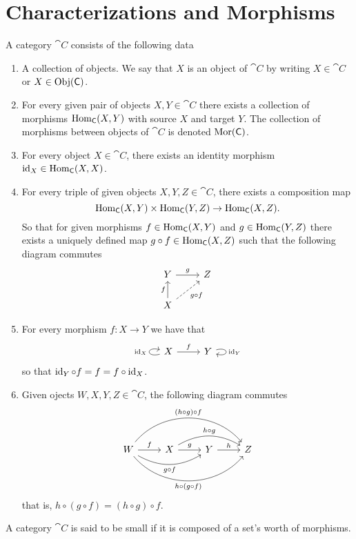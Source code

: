 \section{Characterizations and Morphisms}

\begin{definition}[Category]\label{def: category}
  A category \(\cat C\) consists of the following data
  \begin{enumerate}[(C1)]
    \item A collection of objects. We say that \(X\) is an object of \(\cat C\)
      by writing \(X \in \cat C\) or \(X \in \operatorname{Obj}(\mathsf C)\).
    \item For every given pair of objects \(X, Y \in \cat C\) there exists a
      collection of morphisms \(\operatorname{Hom}_{\mathsf C}(X, Y)\) with source \(X\) and
      target \(Y\). The collection of morphisms between objects of \(\cat C\) is
      denoted \(\operatorname{Mor}(\mathsf C)\).
    \item For every object \(X \in \cat C\), there exists an identity morphism
      \(\operatorname{id}_X \in \operatorname{Hom}_{\mathsf C}(X, X)\).
    \item For every triple of given objects \(X, Y, Z \in \cat C\), there exists
      a composition map
      \[
        \operatorname{Hom}_{\mathsf C}(X, Y) \times \operatorname{Hom}_{\mathsf C}(Y, Z) \to \operatorname{Hom}_{\mathsf C}(X, Z).
      \] 
      So that for given morphisms \(f \in \operatorname{Hom}_{\mathsf C}(X, Y)\) and \(g \in
      \operatorname{Hom}_{\mathsf C}(Y, Z)\) there exists a uniquely defined map \(g \circ f \in
      \operatorname{Hom}_{\mathsf C}(X, Z)\) such that the following diagram commutes
      \[
        \begin{tikzcd}
          Y \ar[r, "g"]
            &Z \\
          X \ar[u, "f"] \ar[ru, dashed, swap, "g \circ f"]
        \end{tikzcd}
      \]
    \item For every morphism \(f: X \to Y\) we have that
      \[
        \begin{tikzcd}
          X \ar[r, "f"] \ar[loop left, "\Id_X"] &Y \ar[loop right, "\Id_Y"]
        \end{tikzcd}
      \] 
      so that \(\operatorname{id}_Y \circ f = f = f \circ \operatorname{id}_X\).
    \item Given ojects \(W, X, Y, Z \in \cat C\), the following diagram commutes
      \[
        \begin{tikzcd}
          W
          \ar[r, "f"]
          \ar[rr, bend right, swap, "g \circ f"]
          \ar[rrr, bend right = 50, swap, "h \circ (g \circ f)"]
          \ar[rrr, bend left = 50, "(h \circ g) \circ f"]
            &X
            \ar[r, "g"] \ar[rr, bend left, "h \circ g"]
              &Y
              \ar[r, "h"] 
                &Z
        \end{tikzcd}
      \] 
      that is, \(h \circ (g \circ f) = (h \circ g) \circ f\).
  \end{enumerate} \end{definition} \begin{definition}[Small]\label{def: small cat}
  A category \(\cat C\) is said to be small if it is composed of a set's worth
  of morphisms.
\end{definition}

